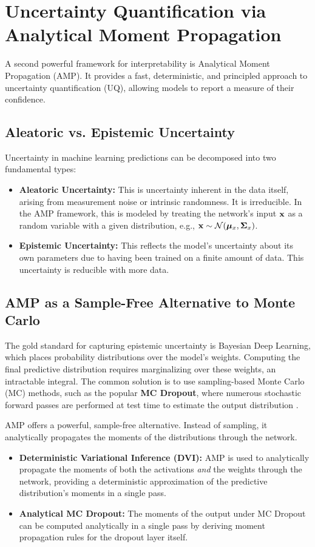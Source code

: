 \section{Uncertainty Quantification via Analytical Moment Propagation}
\label{sec:uq_amp}

A second powerful framework for interpretability is Analytical Moment Propagation (AMP). It provides a fast, deterministic, and principled approach to uncertainty quantification (UQ), allowing models to report a measure of their confidence.

\subsection{Aleatoric vs. Epistemic Uncertainty}
Uncertainty in machine learning predictions can be decomposed into two fundamental types:
\begin{itemize}
    \item \textbf{Aleatoric Uncertainty:} This is uncertainty inherent in the data itself, arising from measurement noise or intrinsic randomness. It is irreducible. In the AMP framework, this is modeled by treating the network's input $\mathbf{x}$ as a random variable with a given distribution, e.g., $\mathbf{x} \sim \mathcal{N}(\boldsymbol{\mu}_x, \boldsymbol{\Sigma}_x)$.
    \item \textbf{Epistemic Uncertainty:} This reflects the model's uncertainty about its own parameters due to having been trained on a finite amount of data. This uncertainty is reducible with more data.
\end{itemize}

\subsection{AMP as a Sample-Free Alternative to Monte Carlo}
The gold standard for capturing epistemic uncertainty is Bayesian Deep Learning, which places probability distributions over the model's weights. Computing the final predictive distribution requires marginalizing over these weights, an intractable integral. The common solution is to use sampling-based Monte Carlo (MC) methods, such as the popular \textbf{MC Dropout}, where numerous stochastic forward passes are performed at test time to estimate the output distribution \cite{GalGhahramani2016DropoutBayes}.

AMP offers a powerful, sample-free alternative. Instead of sampling, it analytically propagates the moments of the distributions through the network.
\begin{itemize}
    \item \textbf{Deterministic Variational Inference (DVI):} AMP is used to analytically propagate the moments of both the activations \textit{and} the weights through the network, providing a deterministic approximation of the predictive distribution's moments in a single pass.
    \item \textbf{Analytical MC Dropout:} The moments of the output under MC Dropout can be computed analytically in a single pass by deriving moment propagation rules for the dropout layer itself.
\end{itemize}


